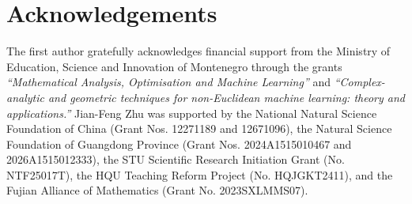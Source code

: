 \documentclass[11pt]{amsart}
\theoremstyle{plain}
\theoremstyle{definition}
\theoremstyle{remark}
\begin{document}
\section*{Acknowledgements}
The first author gratefully acknowledges financial support from the Ministry of Education, Science and Innovation of Montenegro through the grants \emph{``Mathematical Analysis, Optimisation and Machine Learning''} and \emph{``Complex-analytic and geometric techniques for non-Euclidean machine learning: theory and applications.''} Jian-Feng Zhu was supported by the National Natural Science Foundation of China (Grant Nos. 12271189 and 12671096), the Natural Science Foundation of Guangdong Province (Grant Nos. 2024A1515010467 and 2026A1515012333), the STU Scientific Research Initiation Grant (No. NTF25017T), the HQU Teaching Reform Project (No. HQJGKT2411), and the Fujian Alliance of Mathematics (Grant No. 2023SXLMMS07).
\end{document}
